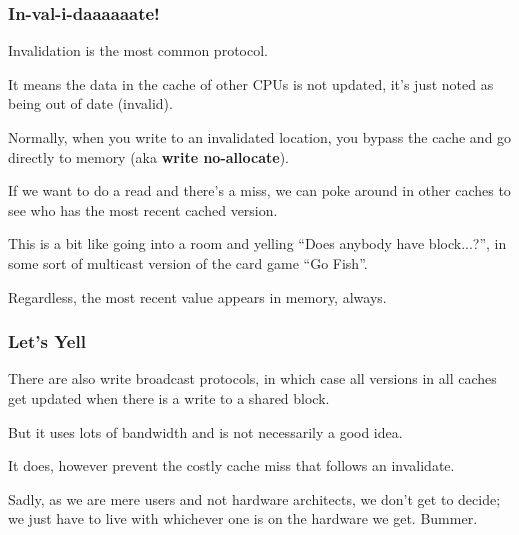 \begin{frame}
\frametitle{In-val-i-daaaaaate!}

Invalidation is the most common protocol. 

It means the data in the cache of other CPUs is not updated, it's just noted as being out of date (invalid).  

Normally, when you write to an invalidated location, you bypass the cache and go directly to memory (aka {\bf write no-allocate}). 

If we want to do a read and there's a miss, we can poke around in other caches to see who has the most recent cached version. 

This is a bit like going into a room and yelling ``Does anybody have block...?'', in some sort of multicast version of the card game ``Go Fish''. 

Regardless, the most recent value appears in memory, always.


\end{frame}



\begin{frame}
\frametitle{Let's Yell}

There are also write broadcast protocols, in which case all versions in all caches get updated when there is a write to a shared block. 

But it uses lots of bandwidth and is not necessarily a good idea. 

It does, however prevent the costly cache miss that follows an invalidate. 

Sadly, as we are mere users and not hardware architects, we don't get to decide; we just have to live with whichever one is on the hardware we get. Bummer.


\end{frame}

